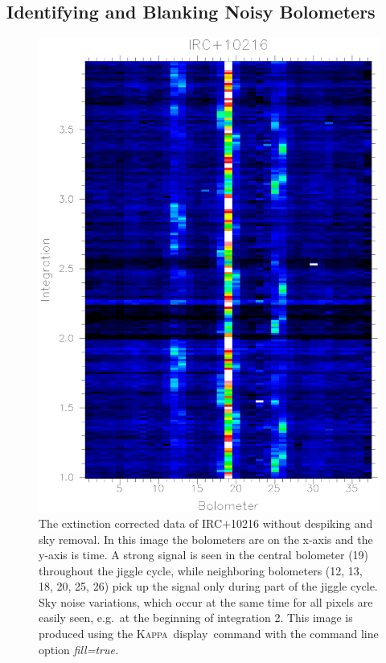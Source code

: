 \documentclass[twoside,11pt]{article}
\newcommand{\Kappa}{\xref{\textsc{Kappa}}{sun95}{}}
\newcommand{\task}[1]{\textsf{#1}}
\newcommand{\display}{\xref{\task{display}}{sun95}{DISPLAY}}
\newcommand{\xref}[3]{#1}
\newcommand{\xlabel}[1]{}
\renewcommand{\_}{\texttt{\symbol{95}}}
\begin{document}
\subsection{\xlabel{Blanking}Identifying and Blanking Noisy
Bolometers}

\begin{figure}
\begin{center}
\includegraphics[width=5.4in]{sc11_fig2.eps}
\caption{The extinction corrected data of IRC$+$10216 without
despiking and sky removal.  In this image the bolometers are on the
x-axis and the y-axis is time. A strong signal is seen in the central
bolometer (19) throughout the jiggle cycle, while neighboring
bolometers (12, 13, 18, 20, 25, 26) pick up the signal only during
part of the jiggle cycle. Sky noise variations, which occur at
the same time for all pixels are easily seen, e.g.\ at the beginning
of integration 2.  This image is produced using the \Kappa\ \display\
command with the command line option \it{fill=true}. }

\label{fig:raw}
\end{center}
\end{figure}
\end{document}
